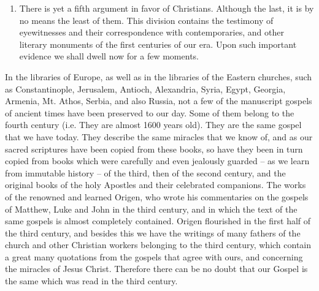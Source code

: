 \begin{enumerate}
    \item There is yet a fifth argument in favor of Christians. Although the last, it is by no means the least of them. This division contains the testimony of eyewitnesses and their correspondence with contemporaries, and other literary monuments of the first centuries of our era. Upon such important evidence we shall dwell now for a few moments.
\end{enumerate}

In the libraries of Europe, as well as in the libraries of the Eastern churches, such as Constantinople, Jerusalem, Antioch, Alexandria, Syria, Egypt, Georgia, Armenia, Mt. Athos, Serbia, and also Russia, not a few of the manuscript gospels of ancient times have been preserved to our day. Some of them belong to the fourth century (i.e. They are almost 1600 years old). They are the same gospel that we have today. They describe the same miracles that we know of, and as our sacred scriptures have been copied from these books, so have they been in turn copied from books which were carefully and even jealously guarded -- as we learn from immutable history -- of the third, then of the second century, and the original books of the holy Apostles and their celebrated companions. The works of the renowned and learned Origen, who wrote his commentaries on the gospels of Matthew, Luke and John in the third century, and in which the text of the same gospels is almost completely contained. Origen flourished in the first half of the third century, and besides this we have the writings of many fathers of the church and other Christian workers belonging to the third century, which contain a great many quotations from the gospels that agree with ours, and concerning the miracles of Jesus Christ. Therefore there can be no doubt that our Gospel is the same which was read in the third century.

